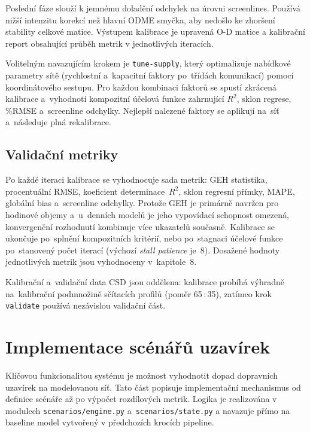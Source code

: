 Poslední fáze slouží k jemnému doladění odchylek na úrovni screenlines. Používá nižší intenzitu korekcí než hlavní ODME smyčka, aby nedošlo ke zhoršení stability celkové matice. Výstupem kalibrace je upravená O-D matice a kalibrační report obsahující průběh metrik v jednotlivých iteracích.

Volitelným navazujícím krokem je \texttt{tune-supply}, který optimalizuje nabídkové parametry sítě (rychlostní a~kapacitní faktory po~třídách komunikací) pomocí koordinátového sestupu. Pro každou kombinaci faktorů se spustí zkrácená kalibrace a~vyhodnotí kompozitní účelová funkce zahrnující $R^2$, sklon regrese, \%RMSE a~screenline odchylky. Nejlepší nalezené faktory se aplikují na~síť a~následuje plná rekalibrace.

\subsection{Validační metriky}
\label{sec:impl-calibration-metrics}

Po každé iteraci kalibrace se vyhodnocuje sada metrik: GEH statistika, procentuální RMSE, koeficient determinace~$R^2$, sklon regresní přímky, MAPE, globální bias a~screenline odchylky. Protože GEH je primárně navržen pro hodinové objemy a~u~denních modelů je jeho vypovídací schopnost omezená, konvergenční rozhodnutí kombinuje více ukazatelů současně. Kalibrace se ukončuje po~splnění kompozitních kritérií, nebo po~stagnaci účelové funkce po~stanovený počet iterací (výchozí \textit{stall patience} je~8). Dosažené hodnoty jednotlivých metrik jsou vyhodnoceny v~kapitole~8.

Kalibrační a~validační data CSD jsou oddělena: kalibrace probíhá výhradně na~kalibrační podmnožině sčítacích profilů (poměr 65\,:\,35), zatímco krok \texttt{validate} používá nezávislou validační část.

\section{Implementace scénářů uzavírek}
\label{sec:impl-scenarios}

Klíčovou funkcionalitou systému je možnost vyhodnotit dopad dopravních uzavírek na modelovanou síť. Tato část popisuje implementační mechanismus od definice scénáře až po výpočet rozdílových metrik. Logika je realizována v modulech \texttt{scenarios/engine.py} a~\texttt{scenarios/state.py} a navazuje přímo na baseline model vytvořený v předchozích krocích pipeline.


